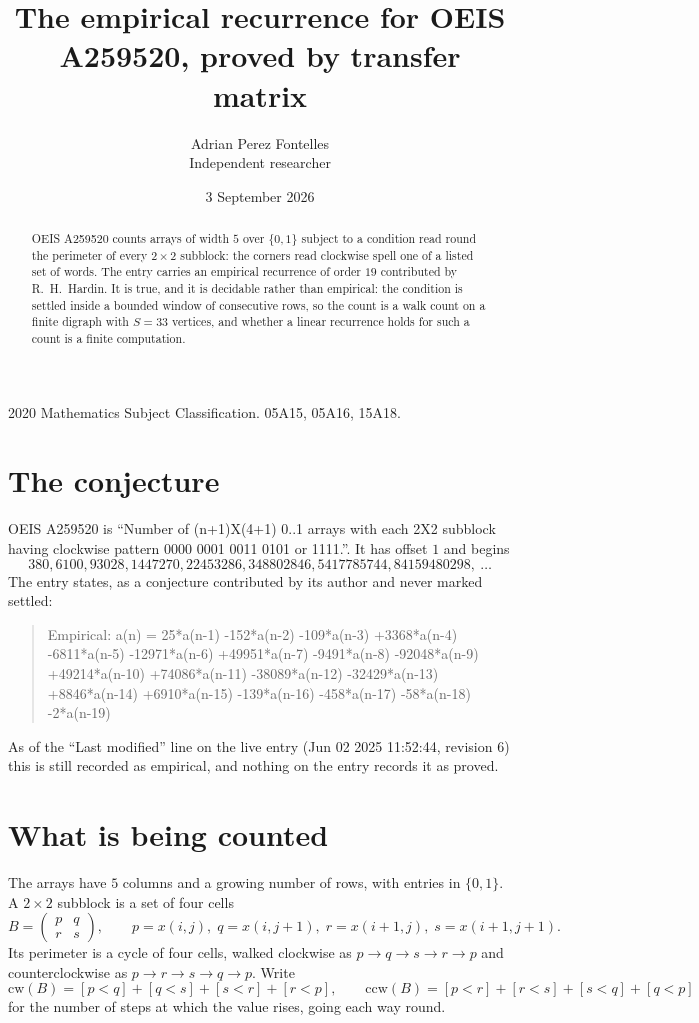 \documentclass[11pt,a4paper]{article}
\title{The empirical recurrence for OEIS A259520, proved by transfer matrix}
\author{Adrian Perez Fontelles\\ \small Independent researcher}
\date{3 September 2026}
\theoremstyle{plain}
\theoremstyle{definition}
\begin{document}
\maketitle

\begin{abstract}
OEIS A259520 counts arrays of width $5$ over $\{0,1\}$ subject to a condition read round the
perimeter of every $2\times2$ subblock: the corners read clockwise spell one of a listed set of words. The entry carries an empirical recurrence of
order $19$ contributed by R.~H.~Hardin. It is true, and it is decidable rather than
empirical: the condition is settled inside a bounded window of consecutive rows, so the
count is a walk count on a finite digraph with $S=33$ vertices, and whether a linear
recurrence holds for such a count is a finite computation.
\end{abstract}

\noindent\small 2020 Mathematics Subject Classification. 05A15, 05A16, 15A18.\normalsize

\section{The conjecture}

OEIS A259520 is ``Number of (n+1)X(4+1) 0..1 arrays with each 2X2 subblock having clockwise pattern 0000 0001 0011 0101 or 1111.''. It has offset $1$ and begins
\[
380, 6100, 93028, 1447270, 22453286, 348802846, 5417785744, 84159480298,\ \dots
\]
The entry states, as a conjecture contributed by its author and never marked settled:
\begin{quote}
Empirical: a(n) = 25*a(n-1) -152*a(n-2) -109*a(n-3) +3368*a(n-4) -6811*a(n-5) -12971*a(n-6) +49951*a(n-7) -9491*a(n-8) -92048*a(n-9) +49214*a(n-10) +74086*a(n-11) -38089*a(n-12) -32429*a(n-13) +8846*a(n-14) +6910*a(n-15) -139*a(n-16) -458*a(n-17) -58*a(n-18) -2*a(n-19)
\end{quote}
As of the ``Last modified'' line on the live entry (Jun 02 2025 11:52:44, revision 6) this is still
recorded as empirical, and nothing on the entry records it as proved.

\section{What is being counted}

The arrays have $5$ columns and a growing number of rows, with entries in $\{0,1\}$. A
$2\times2$ subblock is a set of four cells
\[
B=\begin{pmatrix} p & q \\ r & s \end{pmatrix},
\qquad p=x(i,j),\; q=x(i,j+1),\; r=x(i+1,j),\; s=x(i+1,j+1).
\]
Its perimeter is a cycle of four cells, walked clockwise as $p\to q\to s\to r\to p$ and
counterclockwise as $p\to r\to s\to q\to p$. Write
\[
\mathrm{cw}(B)=[p<q]+[q<s]+[s<r]+[r<p],\qquad
\mathrm{ccw}(B)=[p<r]+[r<s]+[s<q]+[q<p]
\]
for the number of steps at which the value rises, going each way round.
\end{document}
